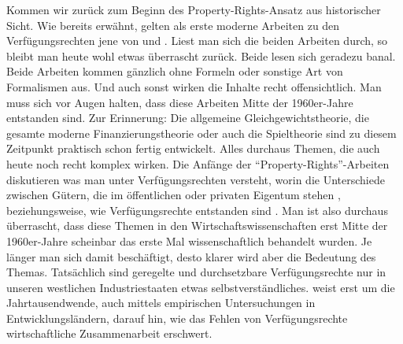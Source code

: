 Kommen wir zurück zum Beginn des Property-Rights-Ansatz aus historischer Sicht. Wie bereits erwähnt, gelten als erste moderne Arbeiten zu den Verfügungsrechten jene von \textcite{Alchian1965} und \textcite{Demsetz1967}. Liest man sich die beiden Arbeiten durch, so bleibt man heute wohl etwas überrascht zurück. Beide lesen sich geradezu banal. Beide Arbeiten kommen gänzlich ohne Formeln oder sonstige Art von Formalismen aus. Und auch sonst wirken die Inhalte recht offensichtlich. Man muss sich vor Augen halten, dass diese Arbeiten Mitte der 1960er-Jahre entstanden sind. Zur Erinnerung: Die allgemeine Gleichgewichtstheorie, die gesamte moderne Finanzierungstheorie oder auch die Spieltheorie sind zu diesem Zeitpunkt praktisch schon fertig entwickelt. Alles durchaus Themen, die auch heute noch recht komplex wirken. Die Anfänge der "`Property-Rights"'-Arbeiten diskutieren was man unter Verfügungsrechten versteht, worin die Unterschiede zwischen Gütern, die im öffentlichen oder privaten Eigentum stehen \parencite{Alchian1965}, beziehungsweise, wie Verfügungsrechte entstanden sind \parencite{Demsetz1967}. Man ist also durchaus überrascht, dass diese Themen in den Wirtschaftswissenschaften erst Mitte der 1960er-Jahre scheinbar das erste Mal wissenschaftlich behandelt wurden. Je länger man sich damit beschäftigt, desto klarer wird aber die Bedeutung des Themas. Tatsächlich sind geregelte und durchsetzbare Verfügungsrechte nur in unseren westlichen Industriestaaten etwas selbstverständliches. \textcite{Soto2000} weist erst um die Jahrtausendwende, auch mittels empirischen Untersuchungen in Entwicklungsländern, darauf hin, wie das Fehlen von Verfügungsrechte wirtschaftliche Zusammenarbeit erschwert.

